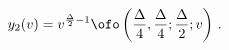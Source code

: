 \begin{equation}
y_2(v) =
v^{{\Delta\over 2}-1} \ofo \left( {\Delta\over 4},  {\Delta\over 4};  
{\Delta\over 2}; v\right)\,.
\label{a_hyper_2}
\end{equation}


